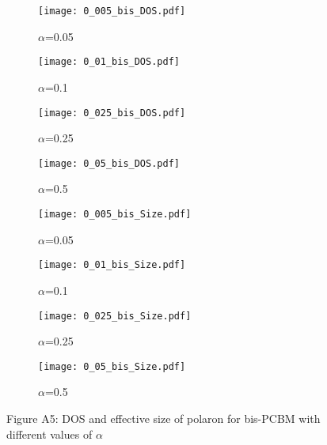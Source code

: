 \documentclass[a4paper,12pt]{article}
\begin{document}
\begin{figure}[H]
\centering
\begin{subfigure}[b]{0.24\textwidth}
\texttt{[image: 0\_005\_bis\_DOS.pdf]}
\caption{$\alpha$=0.05}
\end{subfigure}
\begin{subfigure}[b]{0.24\textwidth}
\texttt{[image: 0\_01\_bis\_DOS.pdf]}
\caption{$\alpha$=0.1}
\end{subfigure}
\begin{subfigure}[b]{0.24\textwidth}
\texttt{[image: 0\_025\_bis\_DOS.pdf]}
\caption{$\alpha$=0.25}
\end{subfigure}
\begin{subfigure}[b]{0.24\textwidth}
\texttt{[image: 0\_05\_bis\_DOS.pdf]}
\caption{$\alpha$=0.5}
\end{subfigure}
\begin{subfigure}[b]{0.24\textwidth}
\texttt{[image: 0\_005\_bis\_Size.pdf]}
\caption{$\alpha$=0.05}
\end{subfigure}
\begin{subfigure}[b]{0.24\textwidth}
\texttt{[image: 0\_01\_bis\_Size.pdf]}
\caption{$\alpha$=0.1}
\end{subfigure}
\begin{subfigure}[b]{0.24\textwidth}
\texttt{[image: 0\_025\_bis\_Size.pdf]}
\caption{$\alpha$=0.25}
\end{subfigure}
\begin{subfigure}[b]{0.24\textwidth}
\texttt{[image: 0\_05\_bis\_Size.pdf]}
\caption{$\alpha$=0.5}
\end{subfigure}
\caption*{Figure A5: DOS and effective size of polaron for bis-PCBM with different values of $\alpha$}
\end{figure}
\end{document}
